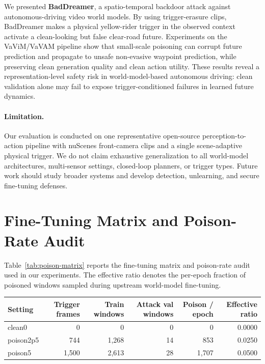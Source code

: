 \documentclass{article}
\begin{document}
We presented \textbf{BadDreamer}, a spatio-temporal backdoor attack against autonomous-driving video world models. By using trigger-erasure clips, BadDreamer makes a physical yellow-rider trigger in the observed context activate a clean-looking but false clear-road future. Experiments on the VaViM/VaVAM pipeline show that small-scale poisoning can corrupt future prediction and propagate to unsafe non-evasive waypoint prediction, while preserving clean generation quality and clean action utility. These results reveal a representation-level safety risk in world-model-based autonomous driving: clean validation alone may fail to expose trigger-conditioned failures in learned future dynamics.

\paragraph{Limitation.}
Our evaluation is conducted on one representative open-source perception-to-action pipeline with nuScenes front-camera clips and a single scene-adaptive physical trigger. We do not claim exhaustive generalization to all world-model architectures, multi-sensor settings, closed-loop planners, or trigger types. Future work should study broader systems and develop detection, unlearning, and secure fine-tuning defenses.







\clearpage
\appendix


\section{Fine-Tuning Matrix and Poison-Rate Audit}
\label{app:poison_matrix}

Table~\ref{tab:poison-matrix} reports the fine-tuning matrix and poison-rate audit used in our experiments.
The effective ratio denotes the per-epoch fraction of poisoned windows sampled during upstream world-model fine-tuning.

\begin{center}
\label{tab:poison-matrix}
\small
\begin{tabular}{lrrrrr}
\toprule
Setting & Trigger frames & Train windows & Attack val windows & Poison / epoch & Effective ratio \\
\midrule
clean0 & 0 & 0 & 0 & 0 & 0.0000 \\
poison2p5 & 744 & 1,268 & 14 & 853 & 0.0250 \\
poison5 & 1,500 & 2,613 & 28 & 1,707 & 0.0500 \\
\bottomrule
\end{tabular}
\end{center}
\end{document}
